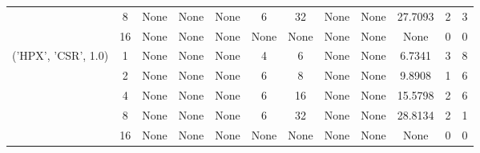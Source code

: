 \begin{tabular}{cccccccccccc}
& 8& None& None& None& 6& 32& None& None& 27.7093& 2& 3\\
& 16& None& None& None& None& None& None& None& None& 0& 0\\
\hline
\multirow{5}{*}{('HPX', 'CSR', 1.0)}& 1& None& None& None& 4& 6& None& None& 6.7341& 3& 8\\
& 2& None& None& None& 6& 8& None& None& 9.8908& 1& 6\\
& 4& None& None& None& 6& 16& None& None& 15.5798& 2& 6\\
& 8& None& None& None& 6& 32& None& None& 28.8134& 2& 1\\
& 16& None& None& None& None& None& None& None& None& 0& 0\\
\hline
\end{tabular}



